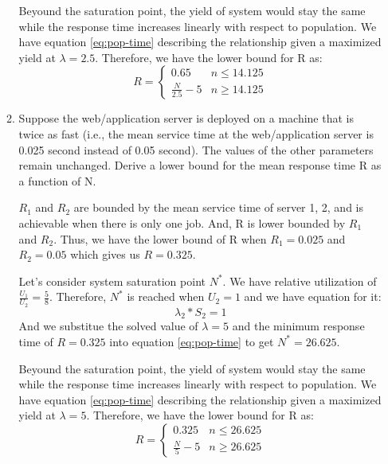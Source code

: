 \documentclass[letterpaper]{article}
\begin{document}
\begin{enumerate}
\begin{enumerate}
Beyound the saturation point, the yield of system would stay the same while the response time increases linearly with respect to population. We have equation \ref{eq:pop-time} describing the relationship given a maximized yield at $\lambda = 2.5$. Therefore, we have the lower bound for R as:
\begin{equation*}
R = \begin{cases}
               0.65                                      & n \le 14.125\\
               \frac{N}{2.5} - 5                    & n \ge 14.125
           \end{cases}
\end{equation*}

\item{} Suppose the web/application server is deployed on a machine that is twice as fast (i.e., the mean service time at the web/application server is 0.025 second instead of 0.05 second). The values of the other parameters remain unchanged. Derive a lower bound for the mean response time R as a function of N.

$R_1$ and $R_2$ are bounded by the mean service time of server 1, 2, and is achievable when there is only one job. And, R is lower bounded by $R_1$ and $R_2$. Thus, we have the lower bound of R when $R_1 = 0.025$ and $R_2 = 0.05$ which gives us $R = 0.325$.

Let's consider system saturation point $N^*$. We have relative utilization of $\frac{U_1}{U_2} = \frac{5}{8}$. Therefore, $N^*$ is reached when $U_2 = 1$ and we have equation for it:
\begin{equation}
\lambda_2 * S_2 = 1
\end{equation}
And we substitue the solved value of $\lambda = 5$ and the minimum response time of $R = 0.325$ into equation \ref{eq:pop-time} to get  $N^* = 26.625$.

Beyound the saturation point, the yield of system would stay the same while the response time increases linearly with respect to population. We have equation \ref{eq:pop-time} describing the relationship given a maximized yield at $\lambda = 5$. Therefore, we have the lower bound for R as:
\begin{equation*}
R = \begin{cases}
               0.325                                   & n \le 26.625\\
               \frac{N}{5} - 5                      & n \ge 26.625
           \end{cases}
\end{equation*}


\end{enumerate}
\end{enumerate}
\end{document}
